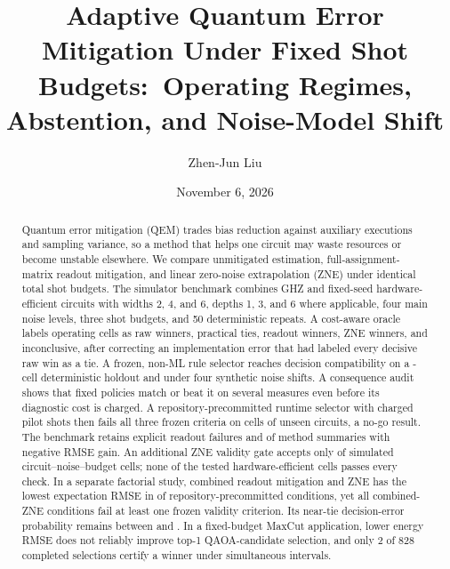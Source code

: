 \documentclass[10pt,twocolumn]{article}
\title{Adaptive Quantum Error Mitigation Under Fixed Shot Budgets:\
Operating Regimes, Abstention, and Noise-Model Shift}
\author{Zhen-Jun Liu}
\date{November 6, 2026}
\begin{document}
\maketitle

\begin{abstract}
Quantum error mitigation (QEM) trades bias reduction against auxiliary executions and
sampling variance, so a method that helps one circuit may waste resources or become
unstable elsewhere. We compare unmitigated estimation, full-assignment-matrix
readout mitigation, and linear zero-noise extrapolation (ZNE) under identical total
shot budgets. The simulator benchmark combines GHZ and fixed-seed
hardware-efficient circuits with widths 2, 4, and 6, depths 1, 3, and 6 where
applicable, four main noise levels, three shot budgets, and 50 deterministic repeats.
A cost-aware oracle labels \OperatingCells{} operating cells as \VTwoRawWinners{}
raw winners, \VTwoPracticalTies{} practical ties, \VTwoReadoutWinners{} readout
winners, \VTwoZNEWinners{} ZNE winners, and \VTwoInconclusive{} inconclusive, after
correcting an implementation error that had labeled every decisive raw win as a tie.
A frozen, non-ML rule selector reaches \HoldoutCompatibilityVTwo{} decision
compatibility on a \HoldoutCells{}-cell deterministic holdout and
\ShiftCompatibilityVTwo{} under four synthetic noise shifts. A consequence audit shows
that fixed policies match or beat it on several measures even before its diagnostic
cost is charged. A repository-precommitted runtime selector with charged pilot shots then fails all
three frozen criteria on \VTwoCells{} cells of unseen circuits, a no-go result.
The benchmark retains \HardwareFailures{} explicit readout failures and
\NegativeGains{} of \SummaryRows{} method summaries with negative RMSE gain.
An additional ZNE validity gate accepts only \ZNECredibleCells{} of
\ZNEValidityCells{} simulated circuit--noise--budget cells; none of the
\ZNEHardwareCells{} tested hardware-efficient cells passes every check.
In a separate factorial study, combined readout mitigation and ZNE has the lowest
expectation RMSE in \CombinedExpectationWins{} of \CombinedExpectationCells{}
repository-precommitted conditions, yet all \CombinedValidityCells{} combined-ZNE conditions
fail at least one frozen validity criterion. Its near-tie decision-error probability
remains between \CombinedNearTieMinimum{} and \CombinedNearTieMaximum{}.
In a fixed-budget MaxCut application, lower energy RMSE does not reliably improve
top-1 QAOA-candidate selection, and only 2 of 828 completed selections certify a
winner under simultaneous intervals.

\end{abstract}
\end{document}
